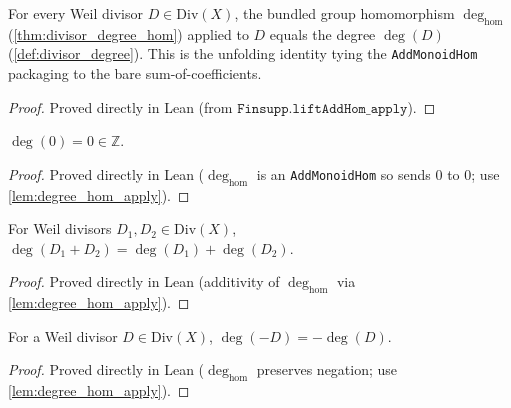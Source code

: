\begin{lemma}

  \label{lem:degree_hom_apply}
  For every Weil divisor \(D \in \mathrm{Div}(X)\), the bundled group
  homomorphism \(\deg_{\mathrm{hom}}\) (\ref{thm:divisor_degree_hom}) applied
  to \(D\) equals the degree \(\deg(D)\) (\ref{def:divisor_degree}). This is
  the unfolding identity tying the \texttt{AddMonoidHom} packaging to the bare
  sum-of-coefficients.
\end{lemma}
\begin{proof}
  Proved directly in Lean (from \(\texttt{Finsupp.liftAddHom\_apply}\)).
\end{proof}
\begin{lemma}

  \label{lem:degree_zero}
  \(\deg(0) = 0 \in \mathbb Z\).
\end{lemma}
\begin{proof}
  Proved directly in Lean (\(\deg_{\mathrm{hom}}\) is an \texttt{AddMonoidHom}
  so sends \(0\) to \(0\); use \ref{lem:degree_hom_apply}).
\end{proof}
\begin{lemma}

  \label{lem:degree_add}
  For Weil divisors \(D_1, D_2 \in \mathrm{Div}(X)\),
  \(\deg(D_1 + D_2) = \deg(D_1) + \deg(D_2)\).
\end{lemma}
\begin{proof}
  Proved directly in Lean (additivity of \(\deg_{\mathrm{hom}}\) via
  \ref{lem:degree_hom_apply}).
\end{proof}
\begin{lemma}

  \label{lem:degree_neg}
  For a Weil divisor \(D \in \mathrm{Div}(X)\), \(\deg(-D) = -\deg(D)\).
\end{lemma}
\begin{proof}
  Proved directly in Lean (\(\deg_{\mathrm{hom}}\) preserves negation; use
  \ref{lem:degree_hom_apply}).
\end{proof}
